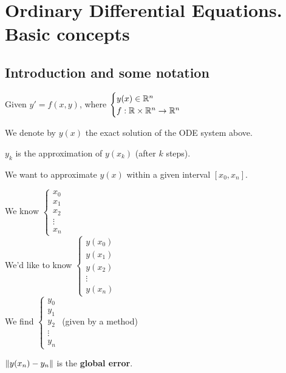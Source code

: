 \section{Ordinary Differential Equations. Basic concepts}

\subsection{Introduction and some notation}

Given $y' = f(x,y)$, where $\begin{cases} y(x) \in \mathbb{R}^n\\ f:\mathbb{R}\times\mathbb{R}^n \to \mathbb{R}^n\end{cases}$

\begin{definition}
  We denote by $y(x)$ the exact solution of the ODE system above.
\end{definition}

\begin{definition}
  $y_k$ is the approximation of $y(x_k)$ (after $k$ steps).
\end{definition}

\begin{objective}
  We want to approximate $y(x)$ within a given interval $[x_0, x_n]$. \\
  \footnotesize{
  \begin{multicols}{3}
    We know $\begin{cases}x_0\\x_1\\x_2\\\vdots\\x_n \end{cases}$\\
    \-\hspace{-2cm}We'd like to know $\begin{cases}y(x_0)\\y(x_1)\\y(x_2)\\\vdots \\y(x_n) \end{cases}$\\
    \-\hspace{-2cm}We find $\begin{cases} y_0\\y_1\\y_2\\\vdots \\y_n \end{cases}$ (given by a method)
  \end{multicols}
  }
\end{objective}
\normalsize
\begin{definition}
  $\left\lVert y(x_n) - y_n\right\rVert$ is the \textbf{global error}.
\end{definition}

